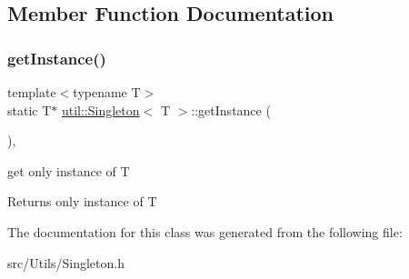 \subsection{Member Function Documentation}
\mbox{\label{classutil_1_1_singleton_a04d271729ac3abd4bc4cc359917af798}} 
\subsubsection{\texorpdfstring{get\+Instance()}{getInstance()}}
{\footnotesize\ttfamily template$<$typename T$>$ \\
static T$\ast$ \mbox{\hyperlink{classutil_1_1_singleton}{util\+::\+Singleton}}$<$ T $>$\+::get\+Instance (\begin{DoxyParamCaption}{ }\end{DoxyParamCaption})\hspace{0.3cm}{\ttfamily [inline]}, {\ttfamily [static]}}



get only instance of T 

\begin{DoxyReturn}{Returns}
only instance of T 
\end{DoxyReturn}


The documentation for this class was generated from the following file\+:\begin{DoxyCompactItemize}
\item 
src/\+Utils/Singleton.\+h\end{DoxyCompactItemize}
